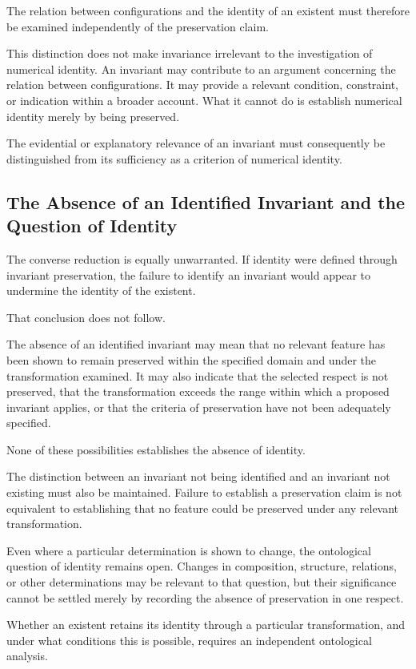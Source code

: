 The relation between configurations and the identity
of an existent must therefore be examined independently
of the preservation claim.

This distinction does not make invariance irrelevant
to the investigation of numerical identity. An
invariant may contribute to an argument concerning
the relation between configurations. It may provide
a relevant condition, constraint, or indication
within a broader account. What it cannot do is
establish numerical identity merely by being
preserved.

The evidential or explanatory relevance of an
invariant must consequently be distinguished from
its sufficiency as a criterion of numerical identity.

\subsection{The Absence of an Identified Invariant and the Question of Identity}

The converse reduction is equally unwarranted.
If identity were defined through invariant
preservation, the failure to identify an invariant
would appear to undermine the identity of the
existent.

That conclusion does not follow.

The absence of an identified invariant may mean
that no relevant feature has been shown to remain
preserved within the specified domain and under
the transformation examined. It may also indicate
that the selected respect is not preserved, that
the transformation exceeds the range within which
a proposed invariant applies, or that the criteria
of preservation have not been adequately specified.

None of these possibilities establishes the absence
of identity.

The distinction between an invariant not being
identified and an invariant not existing must also
be maintained. Failure to establish a preservation
claim is not equivalent to establishing that no
feature could be preserved under any relevant
transformation.

Even where a particular determination is shown
to change, the ontological question of identity
remains open. Changes in composition, structure,
relations, or other determinations may be relevant
to that question, but their significance cannot
be settled merely by recording the absence of
preservation in one respect.

Whether an existent retains its identity through
a particular transformation, and under what
conditions this is possible, requires an independent
ontological analysis.


